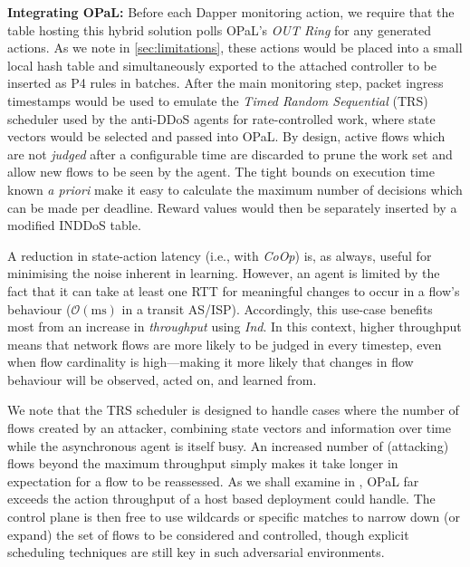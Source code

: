 \documentclass[sigconf,natbib=false]{acmart}
\newcommand{\fakepara}[1]{\noindent\textbf{#1:}}
\newcommand{\approachshort}{OPaL}
\newcommand{\Coopfw}{\emph{CoOp}}
\newcommand{\Indfw}{\emph{Ind}}
\begin{document}
\fakepara{Integrating \approachshort}
Before each Dapper monitoring action, we require that the table hosting this hybrid solution polls \approachshort{}'s \emph{OUT Ring} for any generated actions.
As we note in \cref{sec:limitations}, these actions would be placed into a small local hash table and simultaneously exported to the attached controller to be inserted as P4 rules in batches.
After the main monitoring step, packet ingress timestamps would be used to emulate the \emph{Timed Random Sequential} (TRS) scheduler used by the anti-DDoS agents for rate-controlled work, where state vectors would be selected and passed into \approachshort.
By design, active flows which are not \emph{judged} after a configurable time are discarded to prune the work set and allow new flows to be seen by the agent.
The tight bounds on execution time known \emph{a priori} make it easy to calculate the maximum number of decisions which can be made per deadline.
Reward values would then be separately inserted by a modified INDDoS table.


A reduction in state-action latency (i.e., with \Coopfw) is, as always, useful for minimising the noise inherent in learning.
However, an agent is limited by the fact that it can take at least one RTT for meaningful changes to occur in a flow's behaviour ($\mathcal{O}{\left(\si{\milli\second}\right)}$ in a transit AS/ISP).
Accordingly, this use-case benefits most from an increase in \emph{throughput} using \Indfw{}.
In this context, higher throughput means that network flows are more likely to be judged in every timestep, even when flow cardinality is high---making it more likely that changes in flow behaviour will be observed, acted on, and learned from.

We note that the TRS scheduler is designed to handle cases where the number of flows created by an attacker, combining state vectors and information over time while the asynchronous agent is itself busy.
An increased number of (attacking) flows beyond the maximum throughput simply makes it take longer in expectation for a flow to be reassessed.
As we shall examine in , \approachshort{} far exceeds the action throughput of a host based deployment could handle.
The control plane is then free to use wildcards or specific matches to narrow down (or expand) the set of flows to be considered and controlled, though explicit scheduling techniques are still key in such adversarial environments.
\end{document}
